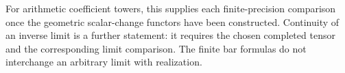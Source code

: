 For arithmetic coefficient towers, this supplies each
finite-precision comparison once the geometric
scalar-change functors have been constructed.
Continuity of an inverse limit is a further statement:
it requires the chosen completed tensor and the
corresponding limit comparison. The finite bar formulas
do not interchange an arbitrary limit with realization.
